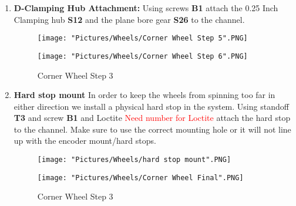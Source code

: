 \documentclass[12pt]{article}
\begin{document}
\begin{enumerate}
\item \textbf{D-Clamping Hub Attachment:} Using screws \textbf{B1} attach the 0.25 Inch Clamping hub \textbf{S12} and the plane bore gear \textbf{S26} to the channel. 

\begin{figure}[H]
  \centering
  \begin{minipage}[b]{0.45\textwidth}
    \texttt{[image: "Pictures/Wheels/Corner Wheel Step 5".PNG]}
  \end{minipage}
  \hfill
  \begin{minipage}[b]{0.45\textwidth}
    \texttt{[image: "Pictures/Wheels/Corner Wheel Step 6".PNG]}
  \end{minipage}
  \caption{Corner Wheel Step 3}
\end{figure}

\item \textbf{Hard stop mount} In order to keep the wheels from spinning too far in either direction we install a physical hard stop in the system. Using standoff \textbf{T3} and screw \textbf{B1} and Loctite \textcolor{red}{Need number for Loctite} attach the hard stop to the channel. Make sure to use the correct mounting hole or it will not line up with the encoder mount/hard stops. 

\begin{figure}[H]
  \centering
  \begin{minipage}[b]{0.45\textwidth}
    \texttt{[image: "Pictures/Wheels/hard stop mount".PNG]}
  \end{minipage}
  \hfill
  \begin{minipage}[b]{0.45\textwidth}
    \texttt{[image: "Pictures/Wheels/Corner Wheel Final".PNG]}
  \end{minipage}
  \caption{Corner Wheel Step 3}
\end{figure}

\end{enumerate}
\end{document}
